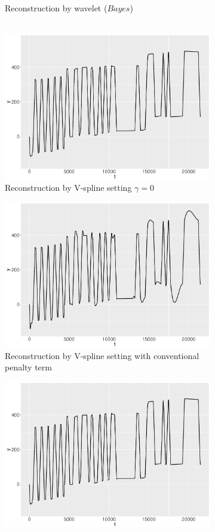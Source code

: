 \begin{figure}
\begin{subfigure}{0.45\textwidth}
    \caption{Reconstruction by wavelet ($\textit{Bayes}$)\\ \mbox{  }}\label{ggRealdataYBayes}
    \end{subfigure}
    \begin{subfigure}{0.45\textwidth}
    \centering
    \includegraphics[width=\linewidth,height=0.5\textwidth]{Chapters/02TractorSplineTheory/plot/ggplot/ggRealdataYTractorGamma.pdf}
    \caption{Reconstruction by V-spline setting  $\gamma=0$ }\label{ggRealdataYTractorGamma}
    \end{subfigure}
    \begin{subfigure}{0.45\textwidth}
    \centering
    \includegraphics[width=\linewidth,height=0.5\textwidth]{Chapters/02TractorSplineTheory/plot/ggplot/ggRealdataYTractorAPT.pdf}
    \caption{Reconstruction by V-spline setting with conventional penalty term}\label{ggRealdataYTractorAPT}
    \end{subfigure}
    \begin{subfigure}{0.45\textwidth}
    \centering
    \includegraphics[width=\linewidth,height=0.5\textwidth]{Chapters/02TractorSplineTheory/plot/ggplot/ggRealdataYTractor.pdf}

\end{subfigure}
\end{figure}
